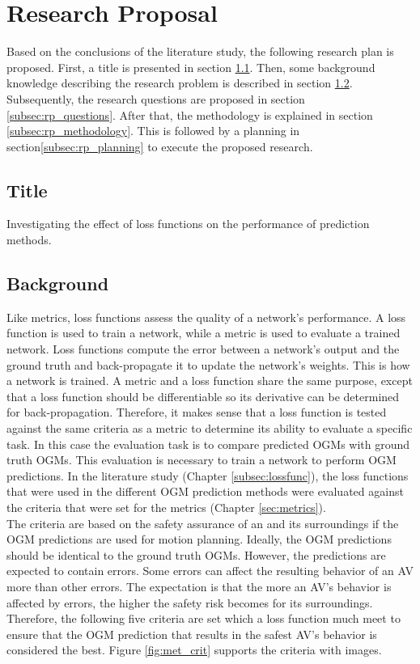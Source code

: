 \section{Research Proposal} \label{sec:res_prop}
Based on the conclusions of the literature study, the following research plan is proposed. First, a title is presented in section \ref{subsec:rp_title}. Then, some background knowledge describing the research problem is described in section \ref{subsec:rp_background}. Subsequently, the research questions are proposed in section \ref{subsec:rp_questions}. After that, the methodology is explained in section \ref{subsec:rp_methodology}. This is followed by a planning in section\ref{subsec:rp_planning} to execute the proposed research. 

\subsection{Title} \label{subsec:rp_title}
Investigating the effect of loss functions on the performance of  prediction methods.

\subsection{Background} \label{subsec:rp_background}
Like metrics, loss functions assess the quality of a network's performance. A loss function is used to train a network, while a metric is used to evaluate a trained network. Loss functions compute the error between a network's output and the ground truth and back-propagate it to update the network's weights. This is how a network is trained. A metric and a loss function share the same purpose, except that a loss function should be differentiable so its derivative can be determined for back-propagation. Therefore, it makes sense that a loss function is tested against the same criteria as a metric to determine its ability to evaluate a specific task. In this case the evaluation task is to compare predicted \glspl{OGM} with ground truth \glspl{OGM}. This evaluation is necessary to train a network to perform \gls{OGM} predictions. In the literature study (Chapter \ref{subsec:lossfunc}), the loss functions that were used in the different \gls{OGM} prediction methods were evaluated against the criteria that were set for the metrics (Chapter \ref{sec:metrics}). \\

The criteria are based on the safety assurance of an  and its surroundings if the \gls{OGM} predictions are used for motion planning. Ideally, the \gls{OGM} predictions should be identical to the ground truth \glspl{OGM}. However, the predictions are expected to contain errors. Some errors can affect the resulting behavior of an \gls{AV} more than other errors. The expectation is that the more an \gls{AV}'s behavior is affected by errors, the higher the safety risk becomes for its surroundings. Therefore, the following five criteria are set which a loss function much meet to ensure that the \gls{OGM} prediction that results in the safest \gls{AV}'s behavior is considered the best. Figure \ref{fig:met_crit} supports the criteria with images.

